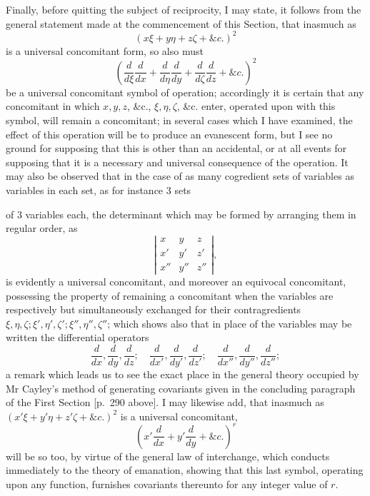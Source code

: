 \documentclass[11pt]{article}
\newcommand{\sourcepage}[1]{\marginpar{\scriptsize p.~#1}}
\begin{document}
Finally, before quitting the subject of reciprocity, I may state, it follows from the general statement made at the commencement of this Section, that inasmuch as
\[
(x\xi+y\eta+z\zeta+\&c.)^2
\]
is a universal concomitant form, so also must
\[
\left(\frac{d}{d\xi}\frac{d}{dx}+\frac{d}{d\eta}\frac{d}{dy}
+\frac{d}{d\zeta}\frac{d}{dz}+\&c.\right)^2
\]
be a universal concomitant symbol of operation; accordingly it is certain that any concomitant in which $x,y,z$, \&c., $\xi,\eta,\zeta$, \&c. enter, operated upon with this symbol, will remain a concomitant; in several cases which I have examined, the effect of this operation will be to produce an evanescent form, but I see no ground for supposing that this is other than an accidental, or at all events for supposing that it is a necessary and universal consequence of the operation. It may also be observed that in the case of as many cogredient sets of variables as variables in each set, as for instance 3 sets

\sourcepage{338}
of 3 variables each, the determinant which may be formed by arranging them in regular order, as
\[
\left|\begin{array}{ccc}
x&y&z\\
x'&y'&z'\\
x''&y''&z''
\end{array}\right|,
\]
is evidently a universal concomitant, and moreover an equivocal concomitant, possessing the property of remaining a concomitant when the variables are respectively but simultaneously exchanged for their contragredients $\xi,\eta,\zeta;\xi',\eta',\zeta';\xi'',\eta'',\zeta''$; which shows also that in place of the variables may be written the differential operators
\[
\frac{d}{dx},\frac{d}{dy},\frac{d}{dz};
\quad
\frac{d}{dx'},\frac{d}{dy'},\frac{d}{dz'};
\quad
\frac{d}{dx''},\frac{d}{dy''},\frac{d}{dz''};
\]
a remark which leads us to see the exact place in the general theory occupied by Mr Cayley's method of generating covariants given in the concluding paragraph of the First Section [p.~290 above]. I may likewise add, that inasmuch as $(x'\xi+y'\eta+z'\zeta+\&c.)^2$ is a universal concomitant,
\[
\left(x'\frac{d}{dx}+y'\frac{d}{dy}+\&c.\right)^r
\]
will be so too, by virtue of the general law of interchange, which conducts immediately to the theory of emanation, showing that this last symbol, operating upon any function, furnishes covariants thereunto for any integer value of $r$.
\end{document}
